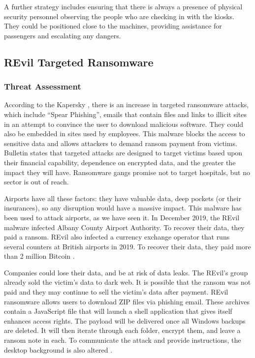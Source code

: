 A further strategy includes ensuring that there is always a presence of physical security personnel observing the people who are checking in with the kiosks. They could be positioned close to the machines, providing assistance for passengers and escalating any dangers.

\subsection{REvil Targeted Ransomware}
\subsubsection{Threat Assessment}
According to the Kapersky \cite{kaspersky}, there is an increase in targeted ransomware attacks, which include ``Spear Phishing'', emails that contain files and links to illicit sites in an attempt to convince the user to download malicious software. They could also be embedded in sites used by employees. This malware blocks the access to sensitive data and allows attackers to demand ransom payment from victims. Bulletin states that targeted attacks are designed to target victims based upon their financial capability, dependence on encrypted data, and the greater the impact they will have. Ransomware gangs promise not to target hospitals, but no sector is out of reach.

Airports have all these factors: they have valuable data, deep pockets (or their insurances), so any disruption would have a massive impact. This malware has been used to attack airports, as we have seen it. In December 2019, the REvil malware infected Albany County Airport Authority. To recover their data, they paid a ransom. REvil also infected a currency exchange operator that runs several counters at British airports in 2019. To recover their data, they paid more than 2 million Bitcoin \cite{panettieri} \cite{isaac_ostroff_hope_2020}.

Companies could lose their data, and be at risk of data leaks. The REvil's group already sold the victim’s data to dark web. It is possible that the ransom was not paid and they may continue to sell the victim's data after payment. REvil ransomware allows users to download ZIP files via phishing email. These archives contain a JavaScript file that will launch a shell application that gives itself enhances access rights. The payload will be delivered once all Windows backups are deleted. It will then iterate through each folder, encrypt them, and leave a ransom note in each. To communicate the attack and provide instructions, the desktop background is also altered \cite{nocturnus}.

